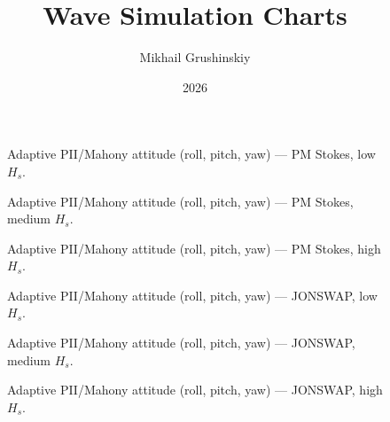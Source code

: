 \documentclass[11pt,letterpaper]{article}
\title{Wave Simulation Charts}
\author{Mikhail Grushinskiy}
\date{2026}
\begin{document}
    \maketitle



    \begin{figure}[H]\centering
    \resizebox{\textwidth}{!}{}
    \caption{Adaptive PII/Mahony attitude (roll, pitch, yaw) --- PM Stokes, low $H_s$.}
    \label{fig:w3d_nonkalman_pmstokes_low_angles}
    \end{figure}

    \begin{figure}[H]\centering
    \resizebox{\textwidth}{!}{}
    \caption{Adaptive PII/Mahony attitude (roll, pitch, yaw) --- PM Stokes, medium $H_s$.}
    \label{fig:w3d_nonkalman_pmstokes_medium_angles}
    \end{figure}

    \begin{figure}[H]\centering
    \resizebox{\textwidth}{!}{}
    \caption{Adaptive PII/Mahony attitude (roll, pitch, yaw) --- PM Stokes, high $H_s$.}
    \label{fig:w3d_nonkalman_pmstokes_high_angles}
    \end{figure}

    \begin{figure}[H]\centering
    \resizebox{\textwidth}{!}{}
    \caption{Adaptive PII/Mahony attitude (roll, pitch, yaw) --- JONSWAP, low $H_s$.}
    \label{fig:w3d_nonkalman_jonswap_low_angles}
    \end{figure}

    \begin{figure}[H]\centering
    \resizebox{\textwidth}{!}{}
    \caption{Adaptive PII/Mahony attitude (roll, pitch, yaw) --- JONSWAP, medium $H_s$.}
    \label{fig:w3d_nonkalman_jonswap_medium_angles}
    \end{figure}

    \begin{figure}[H]\centering
    \resizebox{\textwidth}{!}{}
    \caption{Adaptive PII/Mahony attitude (roll, pitch, yaw) --- JONSWAP, high $H_s$.}
    \label{fig:w3d_nonkalman_jonswap_high_angles}
    \end{figure}
\end{document}
